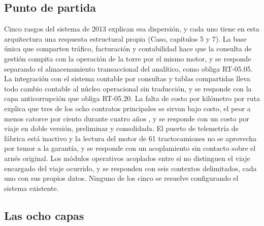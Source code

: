 \subsection{Punto de partida}\label{sec:4-partida}

Cinco rasgos del sistema de 2013 explican esa dispersión, y cada uno tiene en esta arquitectura una
respuesta estructural propia (Caso, capítulos 5 y 7). La base única que comparten tráfico, facturación y
contabilidad hace que la consulta de gestión compita con la operación de la torre por el mismo motor, y
se responde separando el almacenamiento transaccional del analítico, como obliga RT-05.05. La
integración con el sistema contable por consultas y tablas compartidas lleva todo cambio contable al
núcleo operacional sin traducción, y se responde con la capa anticorrupción que obliga RT-05.20. La
falta de costo por kilómetro por ruta explica que tres de los ocho contratos principales se sirvan bajo
costo, el peor a menos catorce por ciento durante cuatro años , y se responde con
un costo por viaje en doble versión, preliminar y consolidada. El puerto de telemetría de fábrica está
inactivo y la lectura del motor de 61 tractocamiones no se aprovecha por temor a la garantía, y se
responde con un acoplamiento sin contacto sobre el arnés original. Los módulos operativos acoplados
entre sí no distinguen el viaje encargado del viaje ocurrido, y se responden con seis contextos
delimitados, cada uno con sus propios datos. Ninguno de los cinco se resuelve configurando el sistema
existente.

\subsection{Las ocho capas}\label{sec:4-capas}


